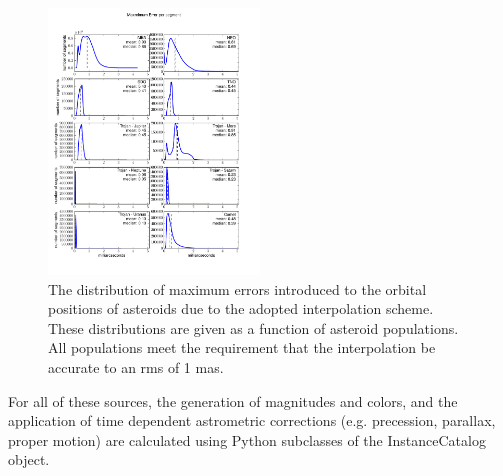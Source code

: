 \documentclass[]{article}
\begin{document}
\begin{figure}[h]
\centering
\includegraphics[width=0.5\textwidth]{validation_figures/ErrorHistogramsLinear.pdf}
\caption{The distribution of maximum errors introduced to the orbital
  positions of asteroids due to the adopted interpolation
  scheme. These distributions are given as a function of asteroid
  populations. All populations meet the requirement that the
  interpolation be accurate to an rms of 1 mas.}
\label{fig:asteroid}
\end{figure}



For all of these sources, the generation of magnitudes and colors, and
the application of time dependent astrometric corrections (e.g.
precession, parallax, proper motion) are calculated using Python
subclasses of the InstanceCatalog object.
\end{document}
